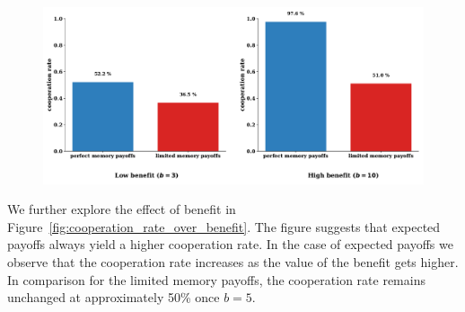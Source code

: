 \documentclass[11pt]{article}
\theoremstyle{plainCl1}
\theoremstyle{plainCl2}
\begin{document}
\begin{figure}[!htbp]
  \centering
  \includegraphics[width=.9\textwidth]{static/cooperation_rates_expected_and_stochastic_for_donation_game.pdf}
\end{figure}

We further explore the effect of benefit in
Figure~\ref{fig:cooperation_rate_over_benefit}. The figure suggests that
expected payoffs always yield a higher cooperation rate. In the case of expected
payoffs we observe that the cooperation rate increases as the value of the
benefit gets higher. In comparison for the limited memory payoffs, the
cooperation rate remains unchanged at approximately 50\% once \(b=5\).

\end{document}
